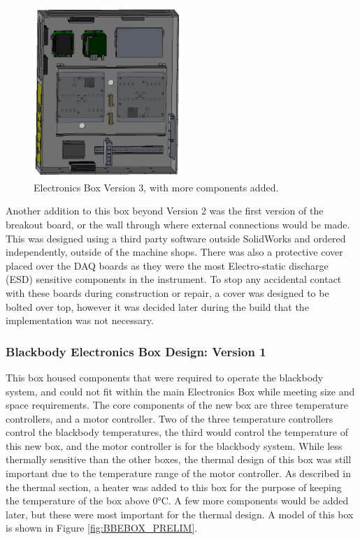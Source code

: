 \begin{figure} %
    \centering
    \includegraphics[width=0.5\textwidth]{chap3_images/LIFE_V5_initial_images/Ebox_V3_init.JPG}
    \caption{Electronics Box Version 3, with more components added.}
    \label{fig:EBOX_V3}
\end{figure}

Another addition to this box beyond Version 2 was the first version of the breakout board, or the wall through where external connections would be made. This was designed using a third party software outside SolidWorks and ordered independently, outside of the machine shops. There was also a protective cover placed over the DAQ boards as they were the most Electro-static discharge (ESD) sensitive components in the instrument. To stop any accidental contact with these boards during construction or repair, a cover was designed to be bolted over top, however it was decided later during the build that the implementation was not necessary. 

\subsubsection{Blackbody Electronics Box Design: Version 1}
This box housed components that were required to operate the blackbody system, and could not fit within the main Electronics Box while meeting size and space requirements. The core components of the new box are three temperature controllers, and a motor controller. Two of the three temperature controllers control the blackbody temperatures, the third would control the temperature of this new box, and the motor controller is for the blackbody system. While less thermally sensitive than the other boxes, the thermal design of this box was still important due to the temperature range of the motor controller. As described in the thermal section, a heater was added to this box for the purpose of keeping the temperature of the box above 0°C. A few more components would be added later, but these were most important for the thermal design. A model of this box is shown in Figure \ref{fig:BBEBOX_PRELIM}.


